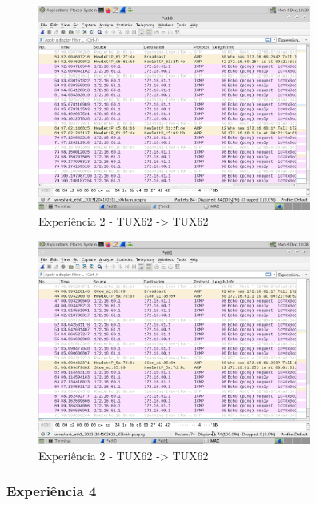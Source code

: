 \documentclass[11pt,a4paper]{article}
\begin{document}
\begin{figure}[H]
    \centering
    \includegraphics[width=0.8\textwidth]{images/experiencia3-captura_4-eth0.png}
    \caption{Experiência 2 - TUX62 -> TUX62}
\end{figure}

\begin{figure}[H]
    \centering
    \includegraphics[width=0.8\textwidth]{images/experiencia3-captura_4-eth1.png}
    \caption{Experiência 2 - TUX62 -> TUX62}
\end{figure}

\subsubsection{Experiência 4}
\end{document}
